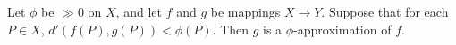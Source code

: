 Let $\phi$ be $\gg 0$ on $X$, and let $f$ and $g$ be mappings $X \rightarrow Y$. Suppose that for each $P \in X$, $d'(f(P), g(P)) < \phi(P)$. Then $g$ is a $\phi$-approximation of $f$.
